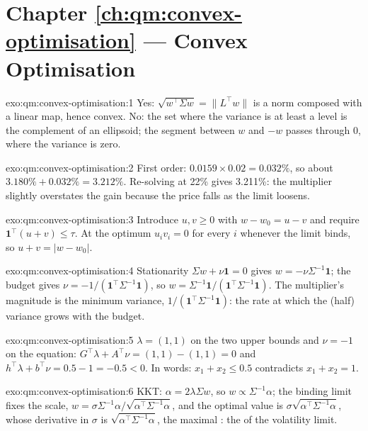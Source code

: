 \section*{Chapter \ref{ch:qm:convex-optimisation} --- Convex Optimisation}

\begin{solution}{exo:qm:convex-optimisation:1}
Yes: $\sqrt{w^\top\Sigma w} = \lVert L^\top w\rVert$ is a norm composed with a linear map, hence convex. No: the set where the variance is at least a level is the complement of an ellipsoid; the
segment between $w$ and $-w$ passes through $0$, where the variance is zero.
\end{solution}

\begin{solution}{exo:qm:convex-optimisation:2}
First order: $0.0159 \times 0.02 = 0.032\%$, so about $3.180\% + 0.032\% = 3.212\%$. Re-solving at 22\% gives 3.211\%: the multiplier slightly overstates the gain because the price falls as the limit
loosens.
\end{solution}

\begin{solution}{exo:qm:convex-optimisation:3}
Introduce $u, v \ge 0$ with $w - w_0 = u - v$ and require $\mathbf 1^\top(u + v) \le \tau$. At the optimum $u_iv_i = 0$ for every $i$ whenever the limit binds, so $u + v = |w - w_0|$.
\end{solution}

\begin{solution}{exo:qm:convex-optimisation:4}
Stationarity $\Sigma w + \nu\mathbf 1 = 0$ gives $w = -\nu\Sigma^{-1}\mathbf 1$; the budget gives $\nu = -1/(\mathbf 1^\top\Sigma^{-1}\mathbf 1)$, so $w = \Sigma^{-1}\mathbf 1/(\mathbf 1^\top\Sigma^{-1}\mathbf 1)$.
The multiplier's magnitude is the minimum variance, $1/(\mathbf 1^\top\Sigma^{-1}\mathbf 1)$: the rate at which the (half) variance grows with the budget.
\end{solution}

\begin{solution}{exo:qm:convex-optimisation:5}
$\lambda = (1, 1)$ on the two upper bounds and $\nu = -1$ on the equation: $G^\top\lambda + A^\top\nu = (1, 1) - (1, 1) = 0$ and $h^\top\lambda + b^\top\nu = 0.5 - 1 = -0.5 < 0$. In words: $x_1 + x_2 \le 0.5$
contradicts $x_1 + x_2 = 1$.
\end{solution}

\begin{solution}{exo:qm:convex-optimisation:6}
KKT: $\alpha = 2\lambda\Sigma w$, so $w \propto \Sigma^{-1}\alpha$; the binding limit fixes the scale, $w = \sigma\Sigma^{-1}\alpha/\sqrt{\alpha^\top\Sigma^{-1}\alpha}$, and the optimal value is $\sigma\sqrt{\alpha^\top\Sigma^{-1}\alpha}$,
whose derivative in $\sigma$ is $\sqrt{\alpha^\top\Sigma^{-1}\alpha}$, the maximal : the  of the volatility limit.
\end{solution}


